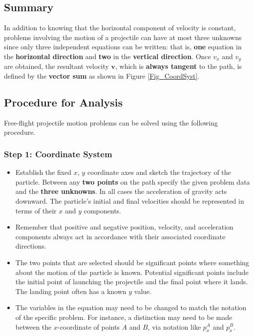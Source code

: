 \documentclass[11pt]{article}
\begin{document}
\subsection{Summary}
\label{sec-3-3}

In addition to knowing that the horizontal component of velocity is
constant, problems involving the motion of a projectile can have at
most three unknowns since only three independent equations can be
written: that is, \textbf{one} equation in the \textbf{horizontal direction} and
\textbf{two} in the \textbf{vertical direction}.  Once $v_x$ and $v_y$ are obtained,
the resultant velocity $\mathbf{v}$, which is \textbf{always tangent} to the
path, is defined by the \textbf{vector sum} as shown in Figure \ref{Fig_CoordSyst}.

\subsection{Procedure for Analysis}
\label{sec-3-4}

Free-flight projectile motion problems can be solved using the
following procedure.

\subsubsection{Step 1: Coordinate System}
\label{sec-3-4-1}

\begin{itemize}
\item Establish the fixed $x$, $y$ coordinate axes and sketch the
trajectory of the particle.  Between any \textbf{two points} on the path
specify the given problem data and the \textbf{three unknowns}.  In all
cases the acceleration of gravity acts downward.  The particle's
initial and final velocities should be represented in terms of their
$x$ and $y$ components.

\item Remember that positive and negative position, velocity, and
acceleration components always act in accordance with their
associated coordinate directions.

\item The two points that are selected should be significant points where
something about the motion of the particle is known.  Potential
significant points include the initial point of launching the
projectile and the final point where it lands. The landing point
often has a known $y$ value.

\item The variables in the equation may need to be changed to match the
notation of the specific problem.  For instance, a distinction may
need to be made between the $x$-coordinate of points $A$ and $B$,
via notation like $p_x^A$ and $p_x^B$.
\end{itemize}
\end{document}
